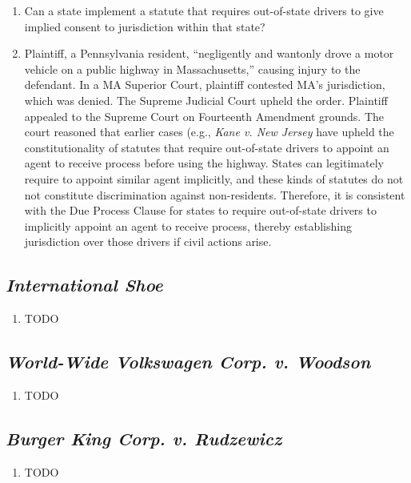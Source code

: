 \begin{enumerate}
    \item Can a state implement a statute that requires out-of-state drivers to give implied consent to jurisdiction within that state?
    \item Plaintiff, a Pennsylvania resident, ``negligently and wantonly drove a motor vehicle on a public highway in Massachusetts,'' causing injury to the defendant. In a MA Superior Court, plaintiff contested MA's jurisdiction, which was denied. The Supreme Judicial Court upheld the order. Plaintiff appealed to the Supreme Court on Fourteenth Amendment grounds. The court reasoned that earlier cases (e.g., \emph{Kane v. New Jersey} have upheld the constitutionality of statutes that require out-of-state drivers to appoint an agent to receive process before using the highway. States can legitimately require to appoint similar agent implicitly, and these kinds of statutes do not not constitute discrimination against non-residents. Therefore, it is consistent with the Due Process Clause for states to require out-of-state drivers to implicitly appoint an agent to receive process, thereby establishing jurisdiction over those drivers if civil actions arise.



\end{enumerate}

\subsection{\emph{International Shoe}}

\begin{enumerate}
    \item TODO
\end{enumerate}

\subsection{\emph{World-Wide Volkswagen Corp. v. Woodson}}

\begin{enumerate}
    \item TODO
\end{enumerate}

\subsection{\emph{Burger King Corp. v. Rudzewicz}}

\begin{enumerate}
    \item TODO
\end{enumerate}

